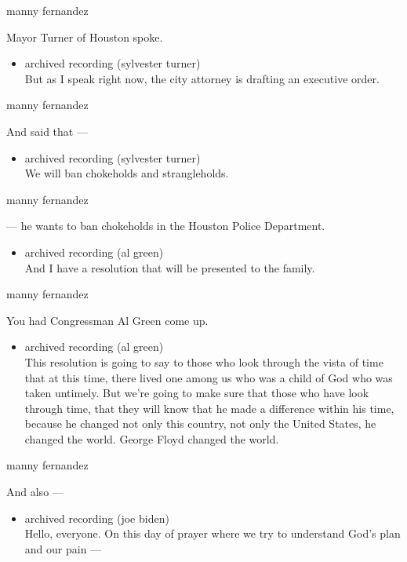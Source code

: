 manny fernandez

Mayor Turner of Houston spoke.

\begin{itemize}
\tightlist
\item
  archived recording (sylvester turner)\\
  But as I speak right now, the city attorney is drafting an executive
  order.
\end{itemize}

manny fernandez

And said that ---

\begin{itemize}
\tightlist
\item
  archived recording (sylvester turner)\\
  We will ban chokeholds and strangleholds.
\end{itemize}

manny fernandez

--- he wants to ban chokeholds in the Houston Police Department.

\begin{itemize}
\tightlist
\item
  archived recording (al green)\\
  And I have a resolution that will be presented to the family.
\end{itemize}

manny fernandez

You had Congressman Al Green come up.

\begin{itemize}
\tightlist
\item
  archived recording (al green)\\
  This resolution is going to say to those who look through the vista of
  time that at this time, there lived one among us who was a child of
  God who was taken untimely. But we're going to make sure that those
  who have look through time, that they will know that he made a
  difference within his time, because he changed not only this country,
  not only the United States, he changed the world. George Floyd changed
  the world.
\end{itemize}

manny fernandez

And also ---

\begin{itemize}
\tightlist
\item
  archived recording (joe biden)\\
  Hello, everyone. On this day of prayer where we try to understand
  God's plan and our pain ---
\end{itemize}

